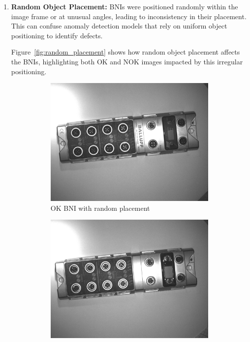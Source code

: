 \documentclass[12pt,DIV14,BCOR12mm,a4paper,footinclude=false,headinclude,parskip=half-,twoside,openright,cleardoublepage=empty,toc=index,bibliography=totoc,listof=totoc]{scrreprt}
\numberwithin{equation}{chapter}
\begin{document}
\begin{enumerate}
    \item \textbf{Random Object Placement:} BNIs were positioned randomly within the image frame or at unusual angles, leading to inconsistency in their placement. This can confuse anomaly detection models that rely on uniform object positioning to identify defects.
    
	Figure~\ref{fig:random_placement} shows how random object placement affects the BNIs, highlighting both OK and NOK images impacted by this irregular positioning.
    \begin{figure}
        \centering
        \begin{subfigure}[b]{0.45\textwidth}
            \centering
            \includegraphics[scale=0.15]{../media/BNI-influence-random-OK.png}
            \caption{OK BNI with random placement}
        \end{subfigure}
        \hfill
        \begin{subfigure}[b]{0.45\textwidth}
            \centering
            \includegraphics[scale=0.15]{../media/BNI-influence-random-NOK.png}

\end{subfigure}
\end{figure}
\end{enumerate}
\end{document}
